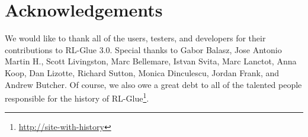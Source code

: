 \documentclass[twoside,11pt]{article}
\begin{document}




\section{Acknowledgements}
We would like to thank all of the users, testers, and developers for their contributions to RL-Glue 3.0. Special thanks to 
Gabor Balasz,  %
Jose Antonio Martin H.,  %
Scott Livingston, %
Marc Bellemare, 
Istvan Svita,  %
Marc Lanctot, 
Anna Koop, 
Dan Lizotte,
Richard Sutton,
Monica Dinculescu,
Jordan Frank, and
Andrew Butcher.  Of course, we also owe a great debt to all of the talented people responsible for the history of RL-Glue\footnote{\url{http://site-with-history}}.

   



%
%




\end{document}
